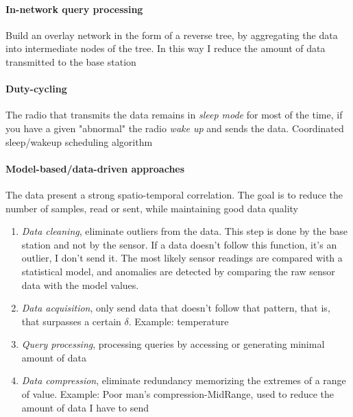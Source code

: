 \paragraph{In-network query processing}
Build an overlay network in the form of a reverse tree, by aggregating the data into intermediate nodes of the tree. In this way I reduce the amount of data transmitted to the base station

\paragraph{Duty-cycling}
The radio that transmits the data remains in \textit{sleep mode} for most of the time, if you have a given "abnormal" the radio \textit{wake up} and sends the data. Coordinated sleep/wakeup scheduling algorithm

\paragraph{Model-based/data-driven approaches}
The data present a strong spatio-temporal correlation. The goal is to reduce the number of samples, read or sent, while maintaining good data quality
\begin{enumerate}
    \item \textit{Data cleaning}, eliminate outliers from the data. This step is done by the base station and not by the sensor. If a data doesn’t follow this function, it’s an outlier, I don’t send it. The most likely sensor readings are compared with a statistical model, and anomalies are detected by comparing the raw sensor data with the model values.
    \item \textit{Data acquisition}, only send data that doesn’t follow that pattern, that is, that surpasses a certain $\delta$. Example: temperature
    \item \textit{Query processing}, processing queries by accessing or generating minimal amount of data
    \item \textit{Data compression}, eliminate redundancy memorizing the extremes of a range of value. Example: Poor man’s compression-MidRange, used to reduce the amount of data I have to send
    
\end{enumerate}

\newpage